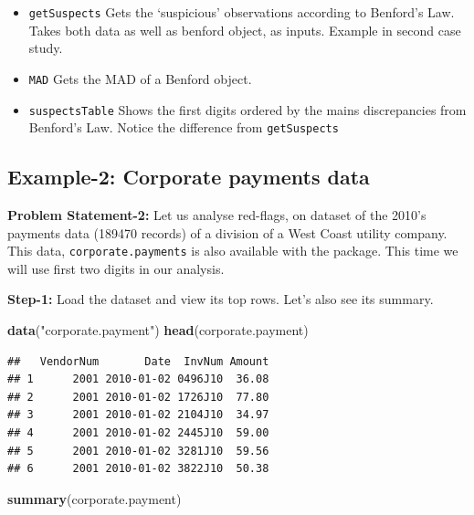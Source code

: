 \documentclass[
]{book}
\newenvironment{Shaded}{\begin{snugshade}}{\end{snugshade}}
\newcommand{\FunctionTok}[1]{\textcolor[rgb]{0.13,0.29,0.53}{\textbf{#1}}}
\newcommand{\NormalTok}[1]{#1}
\newcommand{\StringTok}[1]{\textcolor[rgb]{0.31,0.60,0.02}{#1}}
\providecommand{\tightlist}{%
  \setlength{\itemsep}{0pt}\setlength{\parskip}{0pt}}
\begin{document}
\begin{itemize}
\tightlist
\item
  \texttt{getSuspects} Gets the `suspicious' observations according to Benford's Law. Takes both data as well as benford object, as inputs. Example in second case study.
\item
  \texttt{MAD} Gets the MAD of a Benford object.
\item
  \texttt{suspectsTable} Shows the first digits ordered by the mains discrepancies from Benford's Law. Notice the difference from \texttt{getSuspects}
\end{itemize}

\hypertarget{example-2-corporate-payments-data}{%
\subsection{Example-2: Corporate payments data}\label{example-2-corporate-payments-data}}

\textbf{Problem Statement-2:} Let us analyse red-flags, on dataset of the 2010's payments data (189470 records) of a division of a West Coast utility company. This data, \texttt{corporate.payments} is also available with the package. This time we will use first two digits in our analysis.

\textbf{Step-1:} Load the dataset and view its top rows. Let's also see its summary.

\begin{Shaded}
\begin{Highlighting}[]
\FunctionTok{data}\NormalTok{(}\StringTok{"corporate.payment"}\NormalTok{)}
\FunctionTok{head}\NormalTok{(corporate.payment)}
\end{Highlighting}
\end{Shaded}

\begin{verbatim}
##   VendorNum       Date  InvNum Amount
## 1      2001 2010-01-02 0496J10  36.08
## 2      2001 2010-01-02 1726J10  77.80
## 3      2001 2010-01-02 2104J10  34.97
## 4      2001 2010-01-02 2445J10  59.00
## 5      2001 2010-01-02 3281J10  59.56
## 6      2001 2010-01-02 3822J10  50.38
\end{verbatim}

\begin{Shaded}
\begin{Highlighting}[]
\FunctionTok{summary}\NormalTok{(corporate.payment)}
\end{Highlighting}
\end{Shaded}
\end{document}
